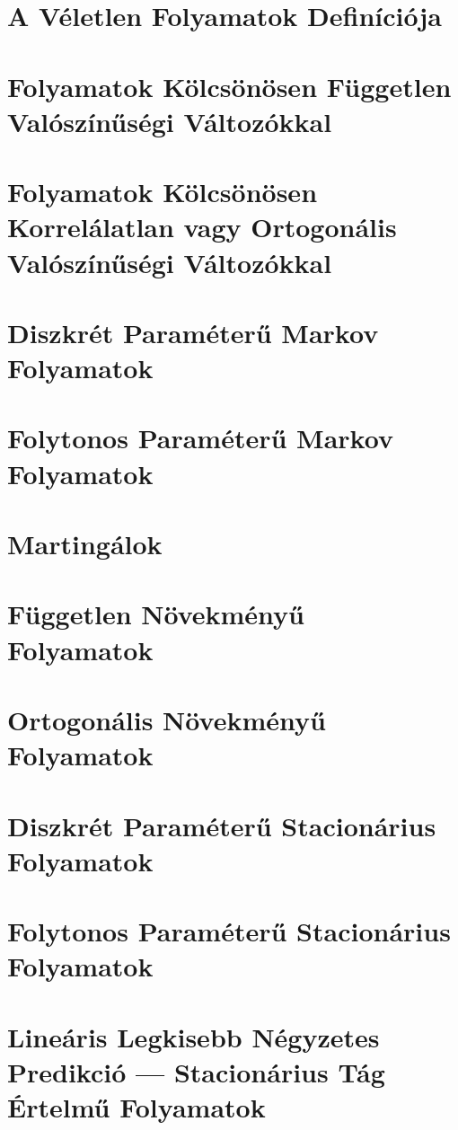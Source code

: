 \documentclass{article}
\begin{document}
\section{A Véletlen Folyamatok Definíciója}\label{sec:veletlenfolyamatokdefinicioja}
\section{Folyamatok Kölcsönösen Független Valószínűségi Változókkal}\label{sec:folyamatokkolcsonosenfuggetlenvaloszinusegivaltozokkal}
\section{Folyamatok Kölcsönösen Korrelálatlan vagy Ortogonális Valószínűségi Változókkal}\label{sec:folyamatokkolcsonosenkorrelalatlanvagyortogonalisvaloszinusegivaltozokkal}
\section{Diszkrét Paraméterű Markov Folyamatok}\label{sec:diszkretparameterumarkov}
\section{Folytonos Paraméterű Markov Folyamatok}\label{sec:folytonosparameterumarkov}
\section{Martingálok}\label{sec:martingalok}
\section{Független Növekményű Folyamatok}\label{sec:fuggetlennovekmenyufolyamatok}
\section{Ortogonális Növekményű Folyamatok}\label{sec:ortogonalisnovekmenyufolyamatok}
\section{Diszkrét Paraméterű Stacionárius Folyamatok}\label{sec:diszkretparameterustacionariusfolyamatok}
\section{Folytonos Paraméterű Stacionárius Folyamatok}\label{sec:folytonosparameterustacionariusfolyamatok}
\section{Lineáris Legkisebb Négyzetes Predikció --- Stacionárius Tág Értelmű Folyamatok}\label{sec:llsp}
\end{document}
